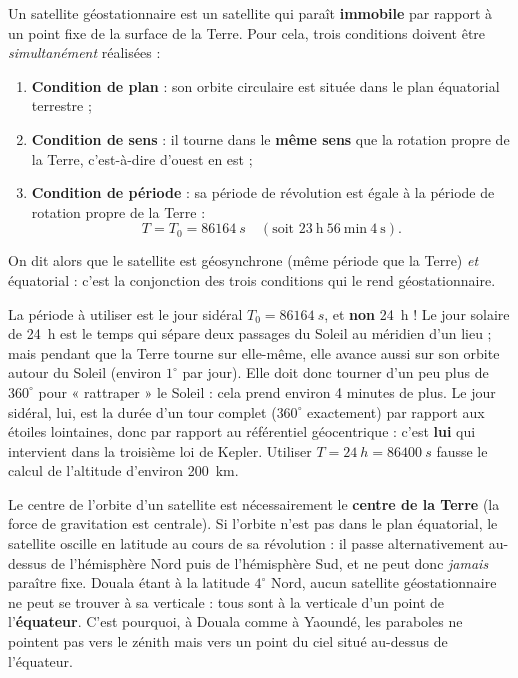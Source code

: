 \documentclass[11pt]{article}
\newcommand{\cle}[1]{{\popxbold\color{popdark}#1}}
\begin{document}
\begin{definition}
Un \cle{satellite géostationnaire} est un satellite qui paraît \textbf{immobile} par rapport à un point fixe de la surface de la Terre. Pour cela, trois conditions doivent être \emph{simultanément} réalisées :
\begin{enumerate}
\item \textbf{Condition de plan} : son orbite circulaire est située dans le \cle{plan équatorial} terrestre ;
\item \textbf{Condition de sens} : il tourne dans le \textbf{même sens} que la rotation propre de la Terre, c'est-à-dire d'ouest en est ;
\item \textbf{Condition de période} : sa période de révolution est égale à la période de rotation propre de la Terre :
\[ T = T_0 = \SI{86164}{s} \quad (\text{soit } 23~\text{h}~56~\text{min}~4~\text{s}). \]
\end{enumerate}
On dit alors que le satellite est \cle{géosynchrone} (même période que la Terre) \emph{et} équatorial : c'est la conjonction des trois conditions qui le rend géostationnaire.
\end{definition}

\begin{attention}
La période à utiliser est le \cle{jour sidéral} $T_0 = \SI{86164}{s}$, et \textbf{non} \SI{24}{h} ! Le jour solaire de \SI{24}{h} est le temps qui sépare deux passages du Soleil au méridien d'un lieu ; mais pendant que la Terre tourne sur elle-même, elle avance aussi sur son orbite autour du Soleil (environ $1^{\circ}$ par jour). Elle doit donc tourner d'un peu plus de $360^{\circ}$ pour « rattraper » le Soleil : cela prend environ 4 minutes de plus. Le jour sidéral, lui, est la durée d'un tour complet ($360^{\circ}$ exactement) par rapport aux étoiles lointaines, donc par rapport au référentiel géocentrique : c'est \textbf{lui} qui intervient dans la troisième loi de Kepler. Utiliser $T = \SI{24}{h} = \SI{86400}{s}$ fausse le calcul de l'altitude d'environ \SI{200}{km}.
\end{attention}

\begin{attention}
Le centre de l'orbite d'un satellite est nécessairement le \textbf{centre de la Terre} (la force de gravitation est centrale). Si l'orbite n'est pas dans le plan équatorial, le satellite oscille en latitude au cours de sa révolution : il passe alternativement au-dessus de l'hémisphère Nord puis de l'hémisphère Sud, et ne peut donc \emph{jamais} paraître fixe. Douala étant à la latitude $4^{\circ}$ Nord, aucun satellite géostationnaire ne peut se trouver à sa verticale : tous sont à la verticale d'un point de l'\textbf{équateur}. C'est pourquoi, à Douala comme à Yaoundé, les paraboles ne pointent pas vers le zénith mais vers un point du ciel situé au-dessus de l'équateur.
\end{attention}
\end{document}

